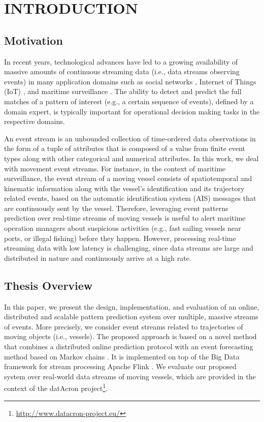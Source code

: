 \chapter{INTRODUCTION}


\section{Motivation}
\par In recent years, technological advances have led to a growing availability of massive amounts of continuous streaming data (i.e., data streams observing events) in many application domains such as social networks \cite{mathioudakis2010twittermonitor}, Internet of Things (IoT) \cite{miorandi2012internet}, and maritime surveillance \cite{patroumpas2015event}.  The ability to detect and predict the full matches of a pattern of interest (e.g., a certain sequence of events), defined by a domain expert, is typically important for operational decision making tasks in the respective domains.

\par An event stream is an unbounded collection of time-ordered data observations in the form of a tuple of attributes that is composed of a value from finite event types along with other categorical and numerical attributes. In this work, we deal with movement event streams. For instance, in the context of maritime surveillance, the event stream of a moving vessel consists of spatiotemporal and kinematic information along with the vessel's identification and its trajectory related events, based on the automatic identification system (AIS) \cite{ais} messages that are continuously sent by the vessel. Therefore, leveraging event patterns prediction over real-time streams of moving vessels is useful to alert maritime operation managers about suspicious activities (e.g., fast sailing vessels near ports, or illegal fishing) before they happen. However, processing real-time streaming data with low latency is challenging, since data streams are large and distributed in nature and continuously arrive at a high rate. 

\section{Thesis Overview}
\par In this paper, we present the design, implementation, and evaluation  of an online, distributed and scalable pattern prediction system over multiple, massive streams of events. More precisely, we consider event streams related to trajectories of moving objects (i.e., vessels). The proposed approach is based on a novel method that combines a distributed online prediction protocol \cite{dekel2012optimal,kamp2014communication} with an event forecasting method based on Markov chains \cite{alevizos2017event}. It is implemented on top of the Big Data framework for stream processing Apache Flink \cite{Flink}. We evaluate our proposed system over real-world data streams of moving vessels, which are provided in the context of the datAcron project\footnote{\url{http://www.datacron-project.eu/}}.

